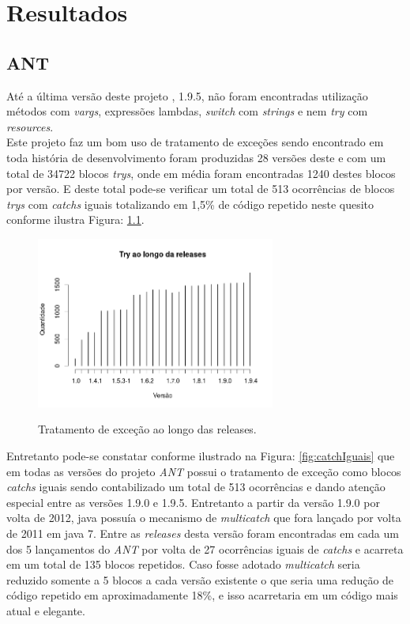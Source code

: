 \chapter {Resultados}

\section{ANT}
Até a última versão deste projeto \cite{apacheAnt}, 1.9.5, não foram encontradas utilização métodos com \textit{vargs}, expressões lambdas, \textit{switch} com \textit{strings} e nem \textit{try} com \textit{resources}.\\

Este projeto faz um bom uso de tratamento de exceções sendo encontrado em toda história de desenvolvimento foram produzidas 28 versões deste e com um total de 34722 blocos \textit{trys}, onde em média foram encontradas 1240 destes blocos por versão. E deste total pode-se verificar um total de 513 ocorrências de blocos \textit{trys} com \textit{catchs} iguais totalizando em 1,5\% de código repetido neste quesito conforme ilustra Figura: \ref{fig:TrysAnt}.\\

	\begin{figure}[h]
		\center
		\includegraphics[width=0.7\textwidth]{Imagens/trysAnt}
		\label{fig:TrysAnt}
		\caption{Tratamento de exceção ao longo das releases.}
	\end{figure}

Entretanto pode-se constatar conforme ilustrado na Figura: \ref{fig:catchIguais} que em todas as versões do projeto \textit{ANT} possui o tratamento de exceção como blocos \textit{catchs} iguais sendo contabilizado um total de 513 ocorrências e dando atenção especial entre as versões 1.9.0 e 1.9.5. Entretanto a partir da versão 1.9.0 por volta de 2012, java possuía o mecanismo de \textit{multicatch} que fora lançado por volta de 2011 em java 7. Entre as \textit{releases} desta versão foram encontradas em cada um dos 5 lançamentos do \textit{ANT} por volta de 27 ocorrências iguais de \textit{catchs} e acarreta em um total de 135 blocos repetidos. Caso fosse adotado \textit{multicatch} seria reduzido somente a 5 blocos a cada versão existente o que seria uma redução de código repetido em aproximadamente 18\%, e isso acarretaria em um código mais atual e elegante.\\

